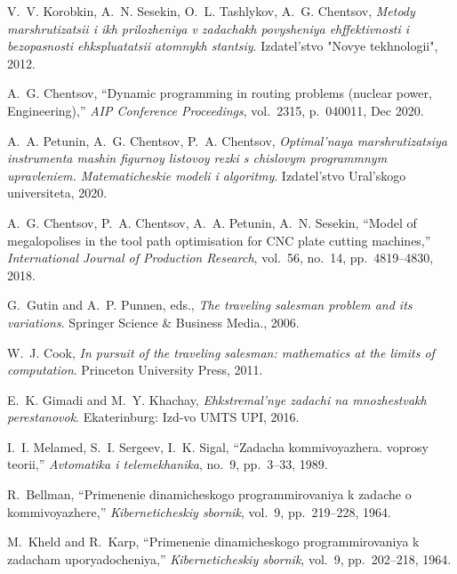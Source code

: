   \item
  V.~V. Korobkin, A.~N. Sesekin, O.~L. Tashlykov, A.~G. Chentsov, {\em Metody
    marshrutizatsii i ikh prilozheniya v zadachakh povysheniya ehffektivnosti i
    bezopasnosti ehkspluatatsii atomnykh stantsiy}.
  \newblock Izdatel'stvo "Novye tekhnologii", 2012.

  \item
  A.~G. Chentsov, ``{Dynamic programming in routing problems (nuclear power,
    Engineering)},'' {\em AIP Conference Proceedings}, vol.~2315, p.~040011, Dec
    2020.

  \item
  A.~A. Petunin, A.~G. Chentsov, P.~A. Chentsov, {\em Optimal'naya
    marshrutizatsiya instrumenta mashin figurnoy listovoy rezki s chislovym
    programmnym upravleniem. Matematicheskie modeli i algoritmy}.
  \newblock Izdatel'stvo Ural'skogo universiteta, 2020.

  \item
  A.~G. Chentsov, P.~A. Chentsov, A.~A. Petunin, A.~N. Sesekin, ``Model of
    megalopolises in the tool path optimisation for {CNC} plate cutting
    machines,'' {\em International Journal of Production Research}, vol.~56,
    no.~14, pp.~4819--4830, 2018.

  \item
  G.~Gutin and A.~P. Punnen, eds., {\em The traveling salesman problem and its
    variations}.
  \newblock Springer Science \& Business Media., 2006.

  \item
  W.~J. Cook, {\em In pursuit of the traveling salesman: mathematics at the
    limits of computation}.
  \newblock Princeton University Press, 2011.

  \item
  E.~K. Gimadi and M.~Y. Khachay, {\em Ehkstremal'nye zadachi na mnozhestvakh
    perestanovok}.
  \newblock Ekaterinburg: Izd-vo UMTS UPI, 2016.

  \item
  I.~I. Melamed, S.~I. Sergeev, I.~K. Sigal, ``Zadacha kommivoyazhera.
    voprosy teorii,'' {\em Avtomatika i telemekhanika}, no.~9, pp.~3--33, 1989.

  \item
  R.~Bellman, ``Primenenie dinamicheskogo programmirovaniya k zadache o
    kommivoyazhere,'' {\em Kiberneticheskiy sbornik}, vol.~9, pp.~219--228, 1964.

  \item
  M.~Kheld and R.~Karp, ``Primenenie dinamicheskogo programmirovaniya k zadacham
    uporyadocheniya,'' {\em Kiberneticheskiy sbornik}, vol.~9, pp.~202--218,
    1964.

